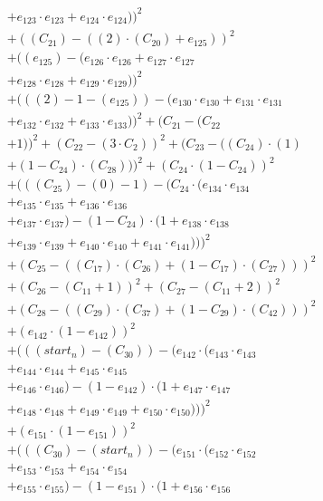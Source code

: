 \documentclass[10pt, a4paper]{article}
\begin{document}
\begin{small}
\begin{align*}
& + e_{123} \cdot e_{123} + e_{124} \cdot e_{124}))^{2} \\
& + ((C_{21}) - ((2)  \cdot  (C_{20}) + e_{125}))^{2} \\
& + ((e_{125}) - (e_{126} \cdot e_{126} + e_{127} \cdot e_{127} \\
& + e_{128} \cdot e_{128} + e_{129} \cdot e_{129}))^{2} \\
& + (((2) - 1 - (e_{125})) - (e_{130} \cdot e_{130} + e_{131} \cdot e_{131} \\
& + e_{132} \cdot e_{132} + e_{133} \cdot e_{133}))^{2} + (C_{21} - (C_{22} \\
& + 1))^{2} + (C_{22} - (3  \cdot  C_{2}))^{2} + (C_{23} - ((C_{24})  \cdot  (1) \\
& + (1 - C_{24})  \cdot  (C_{28})))^{2} + (C_{24} \cdot (1 - C_{24}))^{2} \\
& + (((C_{25}) - (0) - 1) - (C_{24} \cdot (e_{134} \cdot e_{134} \\
& + e_{135} \cdot e_{135} + e_{136} \cdot e_{136} \\
& + e_{137} \cdot e_{137}) - (1 - C_{24}) \cdot (1 + e_{138} \cdot e_{138} \\
& + e_{139} \cdot e_{139} + e_{140} \cdot e_{140} + e_{141} \cdot e_{141})))^{2} \\
& + (C_{25} - ((C_{17})  \cdot  (C_{26}) + (1 - C_{17})  \cdot  (C_{27})))^{2} \\
& + (C_{26} - (C_{11} + 1))^{2} + (C_{27} - (C_{11} + 2))^{2} \\
& + (C_{28} - ((C_{29})  \cdot  (C_{37}) + (1 - C_{29})  \cdot  (C_{42})))^{2} \\
& + (e_{142} \cdot (1 - e_{142}))^{2} \\
& + (((start_n) - (C_{30})) - (e_{142} \cdot (e_{143} \cdot e_{143} \\
& + e_{144} \cdot e_{144} + e_{145} \cdot e_{145} \\
& + e_{146} \cdot e_{146}) - (1 - e_{142}) \cdot (1 + e_{147} \cdot e_{147} \\
& + e_{148} \cdot e_{148} + e_{149} \cdot e_{149} + e_{150} \cdot e_{150})))^{2} \\
& + (e_{151} \cdot (1 - e_{151}))^{2} \\
& + (((C_{30}) - (start_n)) - (e_{151} \cdot (e_{152} \cdot e_{152} \\
& + e_{153} \cdot e_{153} + e_{154} \cdot e_{154} \\
& + e_{155} \cdot e_{155}) - (1 - e_{151}) \cdot (1 + e_{156} \cdot e_{156} \\

\end{align*}
\end{small}
\end{document}
